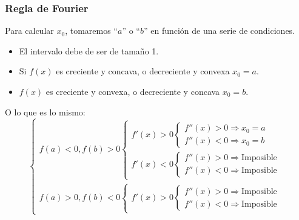 \subsubsection{Regla de Fourier}
Para calcular \(x_0\), tomaremos ``\(a\)'' o ``\(b\)'' en función de una serie de condiciones.
\begin{itemize}
        \item El intervalo debe de ser de tamaño 1.
        \item Si \(f(x)\) es creciente y concava, o decreciente y convexa \(x_0 = a\).
        \item \(f(x)\) es creciente y convexa, o decreciente y concava \(x_0 = b\).
\end{itemize}
O lo que es lo mismo:
\[
        \boxed{
                \begin{cases}
                        f(a) < 0, f(b) > 0 \begin{cases}
                                                   f'(x) > 0
                                                   \begin{cases}
                                        f''(x) > 0 \Rightarrow x_0 = a
                                        \\
                                        f''(x) < 0 \Rightarrow x_0 = b
                                \end{cases}
                                                   \\
                                                   f'(x) < 0
                                                   \begin{cases}
                                        f''(x) > 0 \Rightarrow \text{Imposible}
                                        \\
                                        f''(x) < 0 \Rightarrow \text{Imposible}
                                \end{cases}
                                           \end{cases}
                        \\
                        f(a) > 0, f(b) < 0
                        \begin{cases}
                                f'(x) > 0
                                \begin{cases}
                                        f''(x) > 0 \Rightarrow \text{Imposible}
                                        \\
                                        f''(x) < 0 \Rightarrow \text{Imposible}

\end{cases}
\end{cases}
\end{cases}}\]
